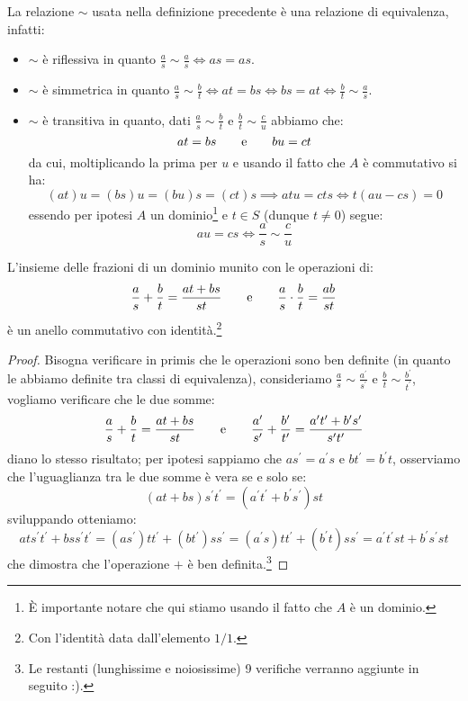 \documentclass[11pt]{scrartcl}
\begin{document}
\begin{remark}
    La relazione $\sim$ usata nella definizione precedente è una relazione di equivalenza, infatti:
    \begin{itemize}
        \item $\sim$ è riflessiva in quanto $\displaystyle\frac{a}{s} \sim \frac{a}{s} \iff as = as$.
        \item $\sim$ è simmetrica in quanto $\displaystyle\frac{a}{s} \sim \frac{b}{t} \iff at = bs \iff bs = at \iff \frac{b}{t} \sim \frac{a}{s}$.
        \item $\sim$ è transitiva in quanto, dati $\displaystyle\frac{a}{s} \sim \frac{b}{t}$ e $\displaystyle\frac{b}{t} \sim \frac{c}{u}$ abbiamo che:
            \[ at = bs \qquad \text e \qquad bu = ct
                \]
        da cui, moltiplicando la prima per $u$ e usando il fatto che $A$ è commutativo si ha:
            \[ (at)u = (bs)u = (bu)s = (ct)s \implies atu = cts \iff t(au-cs) = 0
                \]
        essendo per ipotesi $A$ un dominio\footnote{È importante notare che qui stiamo usando il fatto che $A$ è un dominio.} e $t \in S$ (dunque $t \ne 0$) segue:
            \[ au = cs \iff \frac{a}{s} \sim \frac{c}{u}
                \]
    \end{itemize}
\end{remark}

\begin{proposition}
    L'insieme delle frazioni di un dominio munito con le operazioni di:
    \[ \frac{a}{s} + \frac{b}{t} = \frac{at+bs}{st} \qquad \text e \qquad \frac{a}{s} \cdot \frac{b}{t} = \frac{ab}{st}
        \]
    è un anello commutativo con identità.\footnote{Con l'identità data dall'elemento $1/1$.}
\end{proposition}

\begin{proof}
    Bisogna verificare in primis che le operazioni sono ben definite (in quanto le abbiamo definite tra classi di equivalenza), consideriamo $\displaystyle\frac{a}{s}\sim\frac{a^{\prime}}{s^{\prime}}$ e
    $\displaystyle\frac{b}{t}\sim\frac{b^{\prime}}{t^{\prime}}$, vogliamo verificare che le due somme:
    \[ \frac{a}{s} + \frac{b}{t} = \frac{at+bs}{st} \qquad \text e \qquad \frac{a^{\prime}}{s^{\prime}} + \frac{b^{\prime}}{t^{\prime}} = \frac{a^{\prime}t^{\prime}+b^{\prime}s^{\prime}}{s^{\prime}t^{\prime}}
        \]
    diano lo stesso risultato; per ipotesi sappiamo che $as^{\prime}=a^{\prime}s$ e $bt^{\prime}=b^{\prime}t$, osserviamo che l'uguaglianza tra le due somme è vera se e solo se:
    \[ (at+bs)s^{\prime}t^{\prime} = (a^{\prime}t^{\prime}+b^{\prime}s^{\prime})st
        \]
    sviluppando otteniamo:
    \[ ats^{\prime}t^{\prime} + bss^{\prime}t^{\prime} = (as^{\prime})tt^{\prime} + (bt^{\prime})ss^{\prime} = (a^{\prime}s)tt^{\prime} + (b^{\prime}t)ss^{\prime} = a^{\prime}t^{\prime}st + b^{\prime}s^{\prime}st
        \]
    che dimostra che l'operazione $+$ è ben definita.\footnote{Le restanti (lunghissime e noiosissime) 9 verifiche verranno aggiunte in seguito :).}
\end{proof}
\end{document}
